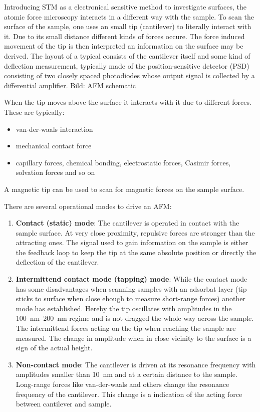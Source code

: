Introducing STM as a electronical sensitive method to investigate surfaces, the atomic force microscopy interacts in a different way with the sample.
To scan the surface of the sample, one uses an small tip (cantilever) to literally interact with it. Due to its small distance different kinds of forces occure. The force induced movement of the tip is then interpreted an information on the surface may be derived.
The layout of a typical  consists of the cantilever itself and some kind of deflection measurement, typically made of the position-sensitive detector (PSD) consisting of two closely spaced photodiodes whose output signal is collected by a differential amplifier.
Bild: AFM schematic

When the tip moves above the surface it interacts with it due to different forces. These are typically:
\begin{itemize}
 \item van-der-waals interaction
 \item mechanical contact force
 \item capillary forces, chemical bonding, electrostatic forces, Casimir forces, solvation forces and so on
\end{itemize}
A magnetic tip can be used to scan for magnetic forces on the sample surface.

There are several operational modes to drive an AFM:
\begin{enumerate}
 \item \textbf{Contact (static) mode}: The cantilever is operated in contact with the sample surface. At very close proximity, repulsive forces are stronger than the attracting ones. The signal used to gain information on the sample is either the feedback loop to keep the tip at the same absolute position or directly the deflection of the cantilever.
 \item \textbf{Intermittend contact mode (tapping) mode}: While the contact mode has some disadvantages when scanning samples with an adsorbat layer (tip sticks to surface when close ehough to measure short-range forces) another mode has established. Hereby the tip oscillates with amplitudes in the \SIrange{100}{200}{\nm} regime and is not dragged the whole way across the sample. The intermittend forces acting on the tip when reaching the sample are measured. The change in amplitude when in close vicinity to the surface is a sign of the actual height.
 \item \textbf{Non-contact mode}: The cantilever is driven at its resonance frequency with amplitudes smaller than \SI{10}{\nm} and at a certain distance to the sample. Long-range forces like van-der-waals and others change the resonance frequency of the cantilever. This change is a indication of the acting force between cantilever and sample.
\end{enumerate}

